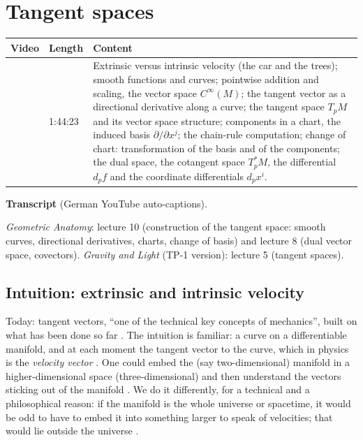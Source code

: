 \chapter{Tangent spaces}\label{ch:c04}
\begin{paracol}{2}

\begin{sources}
\begin{tabularx}{\linewidth}{@{}l l L@{}}
\toprule
\textbf{Video} & \textbf{Length} & \textbf{Content}\\
\midrule
{} & 1:44:23 & Extrinsic versus intrinsic velocity (the car and the trees);
smooth functions and curves; pointwise addition and scaling, the vector space $C^\infty(M)$; the tangent vector as a
directional derivative along a curve; the tangent space $T_pM$ and its vector space structure; components in a chart, the
induced basis $\partial/\partial x^j$; the chain-rule computation; change of chart: transformation of the basis and of the
components; the dual space, the cotangent space $T_p^*M$, the differential $d_pf$ and the coordinate differentials $d_px^i$.\\
\bottomrule
\end{tabularx}

\smallskip
\textbf{Transcript}  (German YouTube auto-captions).
\end{sources}

\begin{reading}
\emph{Geometric Anatomy}: lecture 10 (construction of the tangent space: smooth curves, directional derivatives, charts,
change of basis) and lecture 8 (dual vector space, covectors).
\emph{Gravity and Light} (TP-1 version): lecture 5 (tangent spaces).
\end{reading}

\section{Intuition: extrinsic and intrinsic velocity}\label{sec:ts-intuition}

Today: tangent vectors, ``one of the technical key concepts of mechanics'', built on what has been done so far
. The intuition is familiar: a curve on a differentiable manifold, and at each moment the
tangent vector to the curve, which in physics is the \emph{velocity vector} .
One could embed the (say two-dimensional) manifold in a higher-dimensional space (three-dimensional) and then understand
the vectors sticking out of the manifold . We do it differently, for a technical and a
philosophical reason: if the manifold is the whole universe or spacetime, it would be odd to have to embed it into something
larger to speak of velocities; that would lie outside the universe .


\end{paracol}
